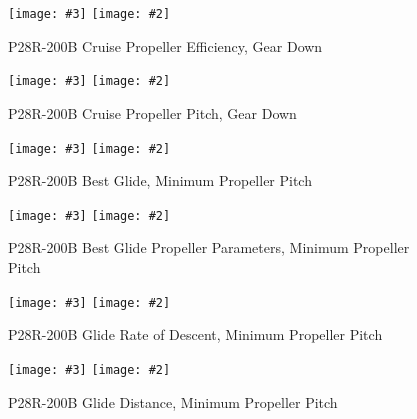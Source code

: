 \documentclass[a4paper,10pt,pdftex]{article}
\newcommand{\jnxfig}[3][]{\ifmypdf\texttt{[image: \#3]}
  \else\texttt{[image: \#2]}\fi}
\begin{document}
\begin{figure}[!htbp]
  \begin{center}
    \jnxfig[angle=0,width=\linewidth]{p28rcruiseeffgd.eps}{p28rcruiseeffgd.pdf}
    \caption{P28R-200B Cruise Propeller Efficiency, Gear Down}
    \label{fig:p28rcruiseeffgd}
  \end{center}
\end{figure}

\begin{figure}[!htbp]
  \begin{center}
    \jnxfig[angle=0,width=\linewidth]{p28rcruisepitchgd.eps}{p28rcruisepitchgd.pdf}
    \caption{P28R-200B Cruise Propeller Pitch, Gear Down}
    \label{fig:p28rcruisepitchgd}
  \end{center}
\end{figure}
\clearpage

\begin{figure}[!htbp]
  \begin{center}
    \jnxfig[angle=0,width=\linewidth]{p28rbestglidepp14.eps}{p28rbestglidepp14.pdf}
    \caption{P28R-200B Best Glide, Minimum Propeller Pitch}
    \label{fig:p28rbestglidepp14}
  \end{center}
\end{figure}

\begin{figure}[!htbp]
  \begin{center}
    \jnxfig[angle=0,width=\linewidth]{p28rbestglideproppp14.eps}{p28rbestglideproppp14.pdf}
    \caption{P28R-200B Best Glide Propeller Parameters, Minimum Propeller Pitch}
    \label{fig:p28rbestglideproppp14}
  \end{center}
\end{figure}

\begin{figure}[!htbp]
  \begin{center}
    \jnxfig[angle=0,width=\linewidth]{p28rgliderodpp14.eps}{p28rgliderodpp14.pdf}
    \caption{P28R-200B Glide Rate of Descent, Minimum Propeller Pitch}
    \label{fig:p28rgliderodpp14}
  \end{center}
\end{figure}

\begin{figure}[!htbp]
  \begin{center}
    \jnxfig[angle=0,width=\linewidth]{p28rglidedistpp14.eps}{p28rglidedistpp14.pdf}
    \caption{P28R-200B Glide Distance, Minimum Propeller Pitch}
    \label{fig:p28rglidedistpp14}
  \end{center}
\end{figure}
\end{document}
